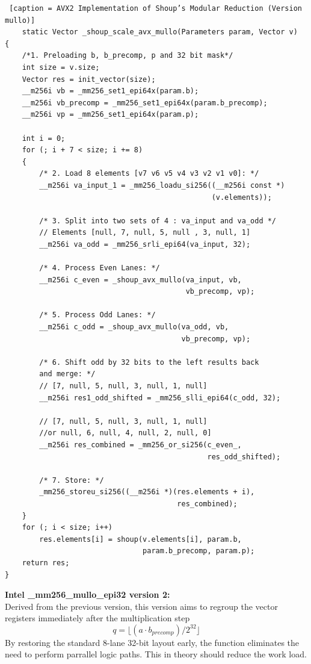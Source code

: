 \documentclass{article}
\begin{document}
\begin{lstlisting} [caption = AVX2 Implementation of Shoup’s Modular Reduction (Version mullo)]
    static Vector _shoup_scale_avx_mullo(Parameters param, Vector v)
{
    /*1. Preloading b, b_precomp, p and 32 bit mask*/
    int size = v.size;
    Vector res = init_vector(size);
    __m256i vb = _mm256_set1_epi64x(param.b);
    __m256i vb_precomp = _mm256_set1_epi64x(param.b_precomp);
    __m256i vp = _mm256_set1_epi64x(param.p);

    int i = 0;
    for (; i + 7 < size; i += 8)
    {
        /* 2. Load 8 elements [v7 v6 v5 v4 v3 v2 v1 v0]: */
        __m256i va_input_1 = _mm256_loadu_si256((__m256i const *)
                                                (v.elements));
        
        /* 3. Split into two sets of 4 : va_input and va_odd */
        // Elements [null, 7, null, 5, null , 3, null, 1]
        __m256i va_odd = _mm256_srli_epi64(va_input, 32); 
        
        /* 4. Process Even Lanes: */
        __m256i c_even = _shoup_avx_mullo(va_input, vb, 
                                          vb_precomp, vp);
        
        /* 5. Process Odd Lanes: */
        __m256i c_odd = _shoup_avx_mullo(va_odd, vb, 
                                         vb_precomp, vp);
       
        /* 6. Shift odd by 32 bits to the left results back 
        and merge: */
        // [7, null, 5, null, 3, null, 1, null]
        __m256i res1_odd_shifted = _mm256_slli_epi64(c_odd, 32); 
        
        // [7, null, 5, null, 3, null, 1, null] 
        //or null, 6, null, 4, null, 2, null, 0]
        __m256i res_combined = _mm256_or_si256(c_even_, 
                                               res_odd_shifted); 
        
        /* 7. Store: */
        _mm256_storeu_si256((__m256i *)(res.elements + i),
                                        res_combined);
    }
    for (; i < size; i++)
        res.elements[i] = shoup(v.elements[i], param.b, 
                                param.b_precomp, param.p);
    return res;
}
\end{lstlisting}

\textbf{Intel \_mm256\_mullo\_epi32 version 2:}\\
Derived from the previous version, this version aims to regroup the vector registers immediately after the
multiplication step 
\[q = \lfloor (a \cdot b_{precomp}) / 2^{32} \rfloor\]
By restoring the standard 8-lane 32-bit layout early, the function eliminates the need to perform parrallel logic paths.
This in theory should reduce the work load.
\end{document}
